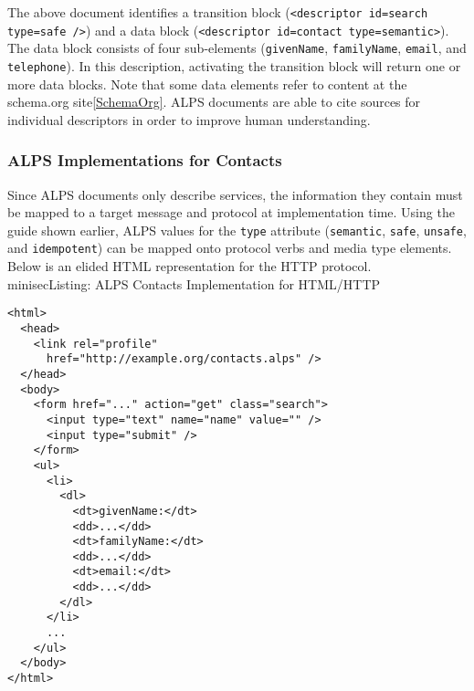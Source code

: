 \documentclass{wsrest2014}
\begin{document}
 \par{}The above document identifies a transition block (\texttt{\textless{}descriptor id=\textquotedbl{}search\textquotedbl{} type=\textquotedbl{}safe\textquotedbl{} /\textgreater{}}) and a data block (\texttt{\textless{}descriptor id=\textquotedbl{}contact\textquotedbl{} type=\textquotedbl{}semantic\textquotedbl{}\textgreater{}}). The data block consists of four sub-elements (\texttt{givenName}, \texttt{familyName}, \texttt{email}, and \texttt{telephone}). In this description, activating the transition block will return one or more data blocks. Note that some data elements refer to content at the schema.org site\hyperlink{SchemaOrg}{[SchemaOrg]}. ALPS documents are able to cite sources for individual descriptors in order to improve human understanding.
\hypertarget{_alps_implementations_for_contacts}{}
\subsubsection{ALPS Implementations for Contacts}
\label{_alps_implementations_for_contacts}
 \par{}Since ALPS documents only describe services, the information they contain must be mapped to a target message and protocol at implementation time.  Using the guide shown earlier, ALPS values for the \texttt{type} attribute (\texttt{semantic}, \texttt{safe}, \texttt{unsafe}, and \texttt{idempotent}) can be mapped onto protocol verbs and media type elements. Below is an elided HTML representation for the HTTP protocol.
\\minisec{Listing: ALPS Contacts Implementation for HTML/HTTP}
\begin{verbatim}<html>
  <head>
    <link rel="profile" 
      href="http://example.org/contacts.alps" />
  </head>
  <body>
    <form href="..." action="get" class="search">
      <input type="text" name="name" value="" />
      <input type="submit" />
    </form>
    <ul>
      <li>
        <dl>
          <dt>givenName:</dt>
          <dd>...</dd>
          <dt>familyName:</dt>
          <dd>...</dd>
          <dt>email:</dt>
          <dd>...</dd>
        </dl>
      </li>
      ...
    </ul>
  </body>
</html>\end{verbatim}
\end{document}
